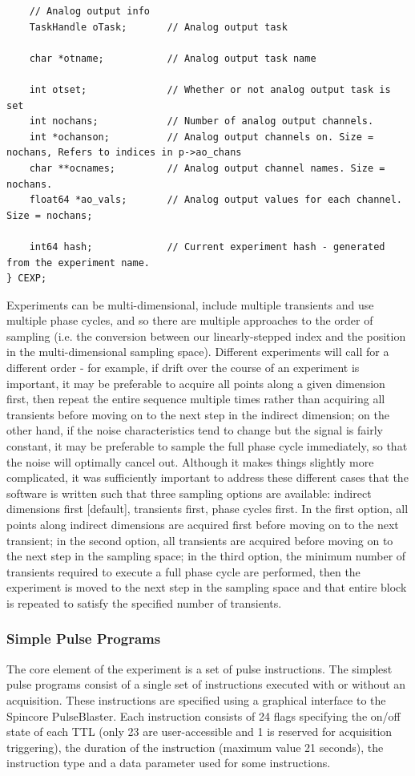 \documentclass[PaulGanssle-Thesis.tex]{subfiles}
\begin{document}
\begin{lstlisting}
	// Analog output info
	TaskHandle oTask;		// Analog output task

	char *otname;			// Analog output task name
	
	int otset;				// Whether or not analog output task is set
	int nochans;			// Number of analog output channels.
	int *ochanson;			// Analog output channels on. Size = nochans, Refers to indices in p->ao_chans
	char **ocnames;			// Analog output channel names. Size = nochans.
	float64 *ao_vals;		// Analog output values for each channel. Size = nochans;
	
	int64 hash;				// Current experiment hash - generated from the experiment name.
} CEXP;
\end{lstlisting}

Experiments can be multi-dimensional, include multiple transients and use multiple phase cycles, and so there are multiple approaches to the order of sampling (i.e. the conversion between our linearly-stepped index and the position in the multi-dimensional sampling space). Different experiments will call for a different order - for example, if drift over the course of an experiment is important, it may be preferable to acquire all points along a given dimension first, then repeat the entire sequence multiple times rather than acquiring all transients before moving on to the next step in the indirect dimension; on the other hand, if the noise characteristics tend to change but the signal is fairly constant, it may be preferable to sample the full phase cycle immediately, so that the noise will optimally cancel out. Although it makes things slightly more complicated, it was sufficiently important to address these different cases that the software is written such that three sampling options are available: indirect dimensions first [default], transients first, phase cycles first. In the first option, all points along indirect dimensions are acquired first before moving on to the next transient; in the second option, all transients are acquired before moving on to the next step in the sampling space; in the third option, the minimum number of transients required to execute a full phase cycle are performed, then the experiment is moved to the next step in the sampling space and that entire block is repeated to satisfy the specified number of transients.

\subsubsection{Simple Pulse Programs}
\label{console.software.simple.pulse.programs}
The core element of the experiment is a set of pulse instructions. The simplest pulse programs consist of a single set of instructions executed with or without an acquisition. These instructions are specified using a graphical interface to the Spincore PulseBlaster. Each instruction consists of 24 flags specifying the on/off state of each TTL (only 23 are user-accessible and 1 is reserved for acquisition triggering), the duration of the instruction (maximum value 21 seconds), the instruction type and a data parameter used for some instructions.
\end{document}
